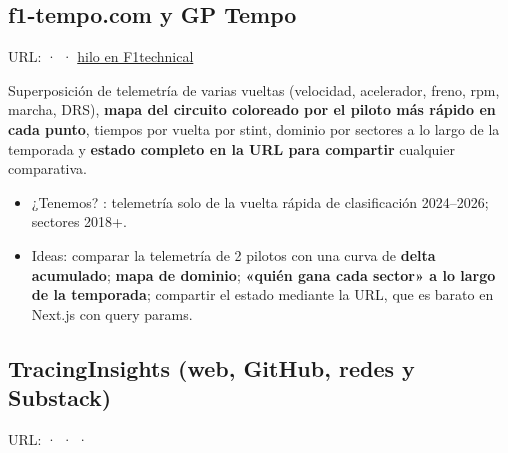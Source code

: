 \subsection{f1-tempo.com y GP Tempo}

URL: \href{https://www.f1-tempo.com/}{} · \href{https://www.gp-tempo.com/}{} · \href{https://www.f1technical.net/forum/viewtopic.php?t=30189}{hilo en F1technical}

Superposición de telemetría de varias vueltas (velocidad, acelerador, freno, rpm, marcha, DRS), \textbf{mapa del circuito coloreado por el piloto más rápido en cada punto}, tiempos por vuelta por stint, dominio por sectores a lo largo de la temporada y \textbf{estado completo en la URL para compartir} cualquier comparativa.

\begin{itemize}
\item ¿Tenemos? \parcial{}: telemetría solo de la vuelta rápida de clasificación 2024–2026; sectores 2018+.
\item Ideas: comparar la telemetría de 2 pilotos con una curva de \textbf{delta acumulado}; \textbf{mapa de dominio}; \textbf{«quién gana cada sector» a lo largo de la temporada}; compartir el estado mediante la URL, que es barato en Next.js con query params.
\end{itemize}

\subsection{TracingInsights (web, GitHub, redes y Substack)}

URL: \href{https://tracinginsights.com/}{} · \href{https://tracinginsights.com/analysis/lap-chart/}{} · \href{https://github.com/TracingInsights/2026}{} · \href{https://tracinginsights.substack.com}{}

